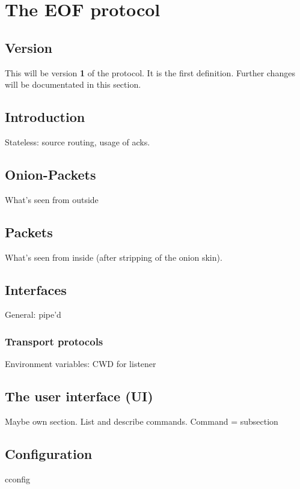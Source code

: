 \documentclass[12pt,a4paper]{book}
\begin{document}
\chapter{The EOF protocol}
\section{Version}
This will be version \textbf{1} of the protocol. It is the first definition.
Further changes will be documentated in this section.
\section{Introduction}
Stateless: source routing, usage of acks.
\section{Onion-Packets}
What's seen from outside
\section{Packets}
What's seen from inside (after stripping of the onion skin).
\section{Interfaces}
General: pipe'd
\subsection{Transport protocols}
Environment variables: CWD for listener
\section{The user interface (UI)}
Maybe own section.
List and describe commands.
Command = subsection
\section{Configuration}
cconfig
\end{document}
